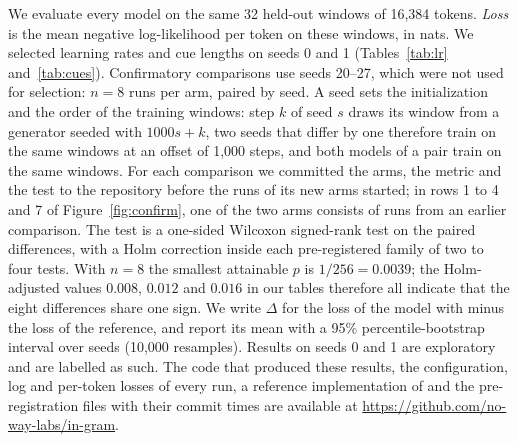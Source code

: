 We evaluate every model on the same 32 held-out windows of 16,384 tokens. \emph{Loss} is the mean
negative log-likelihood per token on these windows, in nats. We selected learning rates and cue
lengths on seeds 0 and 1 (Tables~\ref{tab:lr} and~\ref{tab:cues}). Confirmatory comparisons use
seeds 20--27, which were not used for selection: $n = 8$ runs per arm, paired by seed. A seed sets
the initialization and the order of the training windows: step $k$ of seed $s$ draws its window
from a generator seeded with $1000s + k$, two seeds that differ by one therefore train on the same
windows at an offset of 1,000 steps, and both models of a pair train on the same windows. For each
comparison we committed the arms, the metric and the test to the repository before the runs of its
new arms started; in rows 1 to 4 and 7 of Figure~\ref{fig:confirm}, one of the two arms consists
of runs from an earlier comparison. The
test is a one-sided Wilcoxon signed-rank test on the paired differences, with a Holm correction
inside each pre-registered family of two to four tests. With $n = 8$ the smallest attainable $p$
is $1/256 = 0.0039$; the Holm-adjusted values $0.008$, $0.012$ and $0.016$ in our tables therefore
all indicate that the eight differences share one sign. We write $\Delta$ for the loss of the
model with \ingram{} minus the loss of the reference, and report its mean with a 95\%
percentile-bootstrap interval over seeds (10,000 resamples). Results on seeds 0 and 1 are
exploratory and are labelled as such. The code that produced these results, the configuration, log and
per-token losses of every run, a reference implementation of \ingram{} and the pre-registration
files with their commit times are available at \url{https://github.com/no-way-labs/in-gram}.
